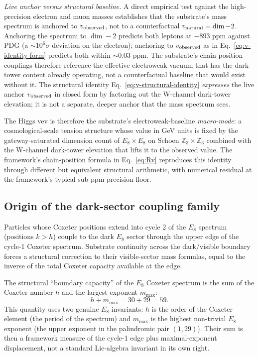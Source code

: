 ﻿\documentclass[reprint,amsmath,amssymb,aps,prd,longbibliography,floatfix]{revtex4-2}
\begin{document}
\emph{Live anchor versus structural baseline.} A direct empirical
test against the high-precision electron and muon masses establishes
that the substrate's mass spectrum is anchored to $v_{\rm observed}$,
not to a counterfactual $v_{\rm natural} = \dim - 2$. Anchoring the
spectrum to $\dim - 2$ predicts both leptons at $-893$ ppm against
PDG (a $\sim 10^6\sigma$ deviation on the electron); anchoring to
$v_{\rm observed}$ as in Eq.~\eqref{eq:v-identity-form} predicts both
within $\sim 0.03$ ppm. The substrate's chain-position couplings
therefore reference the effective electroweak vacuum that has the
dark-tower content already operating, not a counterfactual baseline
that would exist without it. The structural identity
Eq.~\eqref{eq:v-structural-identity} \emph{expresses} the live
anchor $v_{\rm observed}$ in closed form by factoring out the
W-channel dark-tower elevation; it is not a separate, deeper anchor
that the mass spectrum sees.

The Higgs vev is therefore the substrate's electroweak-baseline
\emph{macro-mode}: a cosmological-scale tension structure whose value
in GeV units is fixed by the gateway-saturated dimension count of
$E_8 \times E_8$ on Schoen $\mathbb{Z}_3 \times \mathbb{Z}_3$ combined
with the W-channel dark-tower elevation that lifts it to the observed
value. The framework's chain-position formula in Eq.~\eqref{eq:Rv}
reproduces this identity through different but equivalent structural
arithmetic, with numerical residual at the framework's typical
sub-ppm precision floor.

\subsection{Origin of the dark-sector coupling family}

Particles whose Coxeter positions extend into cycle 2 of the $E_8$
spectrum (positions $k > h$) couple to the dark $E_8$ sector through
the upper edge of the cycle-1 Coxeter spectrum. Substrate continuity
across the dark/visible boundary forces a structural correction to
their visible-sector mass formulas, equal to the inverse of the total
Coxeter capacity available at the edge.

The structural ``boundary capacity'' of the $E_8$ Coxeter spectrum is
the sum of the Coxeter number $h$ and the largest exponent $m_{\max}$:
\begin{equation}
h + m_{\max} = 30 + 29 = 59.
\label{eq:boundarycap}
\end{equation}
This quantity uses two genuine $E_8$ invariants: $h$ is the order of
the Coxeter element (the period of the spectrum) and $m_{\max}$ is the
highest non-trivial $E_8$ exponent (the upper exponent in the
palindromic pair $(1, 29)$). Their sum is then a framework measure of
the cycle-1 edge plus maximal-exponent displacement, not a standard
Lie-algebra invariant in its own right.
\end{document}
